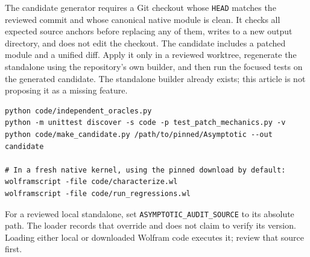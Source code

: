\documentclass[11pt]{article}
\newcommand{\code}[1]{\texttt{#1}}
\begin{document}
The candidate generator requires a Git checkout whose \code{HEAD} matches the reviewed commit and whose canonical native module is clean. It checks all expected source anchors before replacing any of them, writes to a new output directory, and does not edit the checkout. The candidate includes a patched module and a unified diff. Apply it only in a reviewed worktree, regenerate the standalone using the repository's own builder, and then run the focused tests on the generated candidate. The standalone builder already exists; this article is not proposing it as a missing feature.\cite{builder}

\begin{lstlisting}
python code/independent_oracles.py
python -m unittest discover -s code -p test_patch_mechanics.py -v
python code/make_candidate.py /path/to/pinned/Asymptotic --out candidate

# In a fresh native kernel, using the pinned download by default:
wolframscript -file code/characterize.wl
wolframscript -file code/run_regressions.wl
\end{lstlisting}
For a reviewed local standalone, set \code{ASYMPTOTIC\_AUDIT\_SOURCE} to its absolute path. The loader records that override and does not claim to verify its version. Loading either local or downloaded Wolfram code executes it; review that source first.
\end{document}

